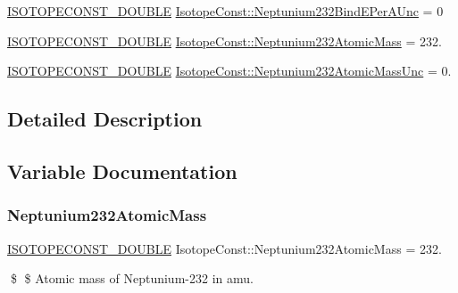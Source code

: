 \begin{DoxyCompactItemize}
\mbox{\hyperlink{group___isotope_const-_macros_ga8f45a7272ce02c0b4c65c44636ed719a}{I\+S\+O\+T\+O\+P\+E\+C\+O\+N\+S\+T\+\_\+\+D\+O\+U\+B\+LE}} \mbox{\hyperlink{group___isotope_const-_neptunium-_np232_ga877910eb0835e9614a16b169507f9e9c}{Isotope\+Const\+::\+Neptunium232\+Bind\+E\+Per\+A\+Unc}} = 0
\item 
\mbox{\hyperlink{group___isotope_const-_macros_ga8f45a7272ce02c0b4c65c44636ed719a}{I\+S\+O\+T\+O\+P\+E\+C\+O\+N\+S\+T\+\_\+\+D\+O\+U\+B\+LE}} \mbox{\hyperlink{group___isotope_const-_neptunium-_np232_gab209de1c678dc7f96bf18108a262dd9c}{Isotope\+Const\+::\+Neptunium232\+Atomic\+Mass}} = 232.
\item 
\mbox{\hyperlink{group___isotope_const-_macros_ga8f45a7272ce02c0b4c65c44636ed719a}{I\+S\+O\+T\+O\+P\+E\+C\+O\+N\+S\+T\+\_\+\+D\+O\+U\+B\+LE}} \mbox{\hyperlink{group___isotope_const-_neptunium-_np232_ga31da45dfd8a453a3d143679f747ef6c5}{Isotope\+Const\+::\+Neptunium232\+Atomic\+Mass\+Unc}} = 0.
\end{DoxyCompactItemize}


\subsection{Detailed Description}


\subsection{Variable Documentation}
\mbox{\label{group___isotope_const-_neptunium-_np232_gab209de1c678dc7f96bf18108a262dd9c}} 
\subsubsection{\texorpdfstring{Neptunium232\+Atomic\+Mass}{Neptunium232AtomicMass}}
{\footnotesize\ttfamily \mbox{\hyperlink{group___isotope_const-_macros_ga8f45a7272ce02c0b4c65c44636ed719a}{I\+S\+O\+T\+O\+P\+E\+C\+O\+N\+S\+T\+\_\+\+D\+O\+U\+B\+LE}} Isotope\+Const\+::\+Neptunium232\+Atomic\+Mass = 232.}

\$ \$ Atomic mass of Neptunium-\/232 in amu. \mbox{\label{group___isotope_const-_neptunium-_np232_ga31da45dfd8a453a3d143679f747ef6c5}} 
